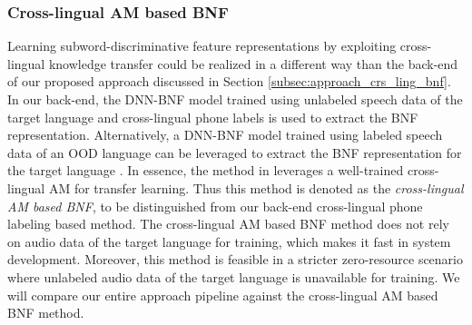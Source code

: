 \documentclass[transmag]{IEEEtran}
\begin{document}



\subsubsection{Cross-lingual AM based BNF}
\label{subsubsec:approach_comparative_approaches_crsling_am}
Learning subword-discriminative feature representations by exploiting   cross-lingual knowledge transfer could be realized in a different way than the back-end of our proposed approach discussed in Section  \ref{subsec:approach_crs_ling_bnf}. In our back-end, the DNN-BNF model trained using unlabeled speech data of the target language and cross-lingual phone labels is used to extract the BNF representation. Alternatively, a DNN-BNF model trained using labeled speech data of an OOD language can be leveraged to extract the BNF representation for the target language  \cite{shibata2017composite,tsuchiya2018speaker}. 
In essence, the method in \cite{shibata2017composite,tsuchiya2018speaker}
leverages a well-trained cross-lingual AM for transfer learning. Thus this method is denoted as the \textit{cross-lingual AM based BNF}, to be distinguished from  our back-end  cross-lingual phone labeling based method. 
The cross-lingual AM based BNF method does not rely on  audio data of the target language for training, which makes it fast in system development. Moreover, this method is feasible in a stricter zero-resource scenario where unlabeled audio data of the target language is unavailable for training. We will compare our entire approach pipeline against the cross-lingual AM based BNF method. 
\end{document}
